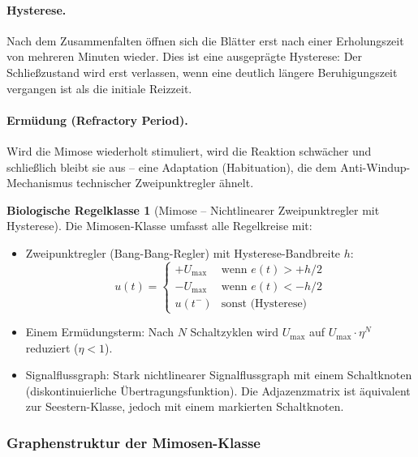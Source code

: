 \documentclass[a4paper,12pt]{article}
\theoremstyle{definition}
\newtheorem{klasse}{Biologische Regelklasse}
\begin{document}
\paragraph{Hysterese.}
Nach dem Zusammenfalten öffnen sich die Blätter erst nach einer Erholungszeit
von mehreren Minuten wieder. Dies ist eine ausgeprägte Hysterese: Der
Schließzustand wird erst verlassen, wenn eine deutlich längere Beruhigungszeit
vergangen ist als die initiale Reizzeit.

\paragraph{Ermüdung (Refractory Period).}
Wird die Mimose wiederholt stimuliert, wird die Reaktion schwächer und
schließlich bleibt sie aus -- eine Adaptation (Habituation), die dem
Anti-Windup-Mechanismus technischer Zweipunktregler ähnelt.

\begin{klasse}[Mimose -- Nichtlinearer Zweipunktregler mit Hysterese]
	\label{kl:mimose}
	Die Mimosen-Klasse umfasst alle Regelkreise mit:
	\begin{itemize}
		\item Zweipunktregler (Bang-Bang-Regler) mit Hysterese-Bandbreite $h$:
		\[
		u(t) = \begin{cases}
			+U_{\max} & \text{wenn } e(t) > +h/2 \\
			-U_{\max} & \text{wenn } e(t) < -h/2 \\
			u(t^-)    & \text{sonst (Hysterese)}
		\end{cases}
		\]
		\item Einem Ermüdungsterm: Nach $N$ Schaltzyklen wird $U_{\max}$ auf
		$U_{\max} \cdot \eta^N$ reduziert ($\eta < 1$).
		\item Signalflussgraph: Stark nichtlinearer Signalflussgraph mit
		einem Schaltknoten (diskontinuierliche Übertragungsfunktion).
		Die Adjazenzmatrix ist äquivalent zur Seestern-Klasse, jedoch
		mit einem markierten Schaltknoten.
	\end{itemize}
\end{klasse}

\subsubsection{Graphenstruktur der Mimosen-Klasse}
\end{document}
